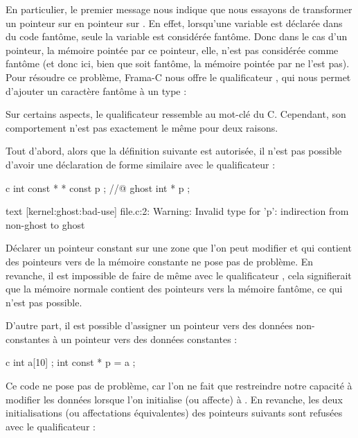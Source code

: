 En particulier, le premier message nous indique que nous essayons de transformer
un pointeur sur  en pointeur sur
. En effet, lorsqu'une variable est déclarée dans du code fantôme,
seule la variable est considérée fantôme. Donc dans le cas d'un pointeur, la mémoire
pointée par ce pointeur, elle, n'est pas considérée comme fantôme (et donc ici, bien
que  soit fantôme, la mémoire pointée par  ne l'est
pas). Pour résoudre ce problème, Frama-C nous offre le qualificateur
, qui nous permet d'ajouter un caractère fantôme
à un type :




Sur certains aspects, le qualificateur  ressemble
au mot-clé  du C. Cependant, son comportement n'est pas
exactement le même pour deux raisons.


Tout d'abord, alors que la définition  suivante
est autorisée,  il n'est pas possible d'avoir une déclaration de
forme similaire avec le qualificateur  :


\begin{CodeBlock}{c}
int const * * const p ;
//@ ghost int \ghost * * p ;
\end{CodeBlock}


\begin{CodeBlock}{text}
[kernel:ghost:bad-use] file.c:2: Warning:
  Invalid type for 'p': indirection from non-ghost to ghost
\end{CodeBlock}



Déclarer un pointeur constant sur une zone que l'on peut modifier et qui contient
des pointeurs vers de la mémoire constante ne pose pas de problème. En revanche,
il est impossible de faire de même avec le qualificateur
, cela signifierait que la mémoire normale
contient des pointeurs vers la mémoire fantôme, ce qui n'est pas possible.


D'autre part, il est possible d'assigner un pointeur
vers des données non-constantes à un pointeur vers des données constantes :


\begin{CodeBlock}{c}
int a[10] ;
int const * p = a ;
\end{CodeBlock}


Ce code ne pose pas de problème, car l'on ne fait que restreindre notre capacité
à modifier les données lorsque l'on initialise (ou affecte)  à
. En revanche, les deux initialisations (ou affectations
équivalentes) des pointeurs suivants sont refusées avec le qualificateur
 :


